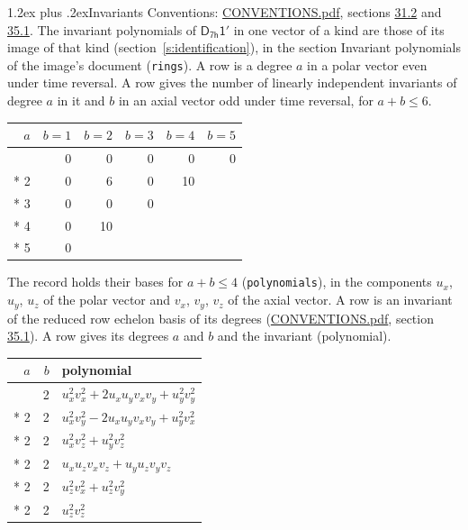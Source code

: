 \documentclass[10pt,a4paper]{article}
\makeatletter
\renewcommand\section{\@startsection{section}{1}{\z@}{-3ex plus -1ex minus -.2ex}%
  {1.2ex plus .2ex}{\normalfont\large\sffamily\bfseries\color{parttitle}}}
\numberwithin{equation}{section}
\newcommand{\grp}[1]{\mathsf{#1}}
\makeatother
\begin{document}
\section{Invariants}\label{s:invariants}
Conventions: \href{../../CONVENTIONS.pdf}{CONVENTIONS.pdf}, sections \href{../../CONVENTIONS.pdf\#conv.31.2}{31.2} and \href{../../CONVENTIONS.pdf\#conv.35.1}{35.1}.
The invariant polynomials of $\grp{D_{7h}1'}$ in one vector of a kind are those of its image of that kind (section~\ref{s:identification}), in the section Invariant polynomials of the image's document (\texttt{rings}).
\leavevmode\label{n:index.degree.polar}\label{n:index.degree.axial}A row is a degree $a$ in a polar vector even under time reversal. A row gives the number of linearly independent invariants of degree $a$ in it and $b$ in an axial vector odd under time reversal, for $a + b \le 6$.
{\small\begin{longtable}{@{}rrrrrr@{}}\toprule
$a$ & $b = 1$ & $b = 2$ & $b = 3$ & $b = 4$ & $b = 5$\\\midrule\endhead
\bottomrule\endfoot\endlastfoot
1 & 0 & 0 & 0 & 0 & 0\\*
2 & 0 & 6 & 0 & 10 & \\*
3 & 0 & 0 & 0 &  & \\*
4 & 0 & 10 &  &  & \\*
5 & 0 &  &  &  & \\
\bottomrule\end{longtable}}
\leavevmode\label{n:local.component.polar}\label{n:local.component.axial}The record holds their bases for $a + b \le 4$ (\texttt{polynomials}), in the components $u_{x}$, $u_{y}$, $u_{z}$ of the polar vector and $v_{x}$, $v_{y}$, $v_{z}$ of the axial vector. \label{n:head.polynomial}A row is an invariant of the reduced row echelon basis of its degrees (\href{../../CONVENTIONS.pdf}{CONVENTIONS.pdf}, section \href{../../CONVENTIONS.pdf\#conv.35.1}{35.1}). A row gives its degrees $a$ and $b$ and the invariant (polynomial).
{\small\renewcommand{\arraystretch}{1.2}\begin{longtable}{@{}rrl@{}}\toprule
$a$ & $b$ & polynomial\\\midrule\endhead
\bottomrule\endfoot\endlastfoot
2 & 2 & $u_{x}^{2}v_{x}^{2} + 2u_{x}u_{y}v_{x}v_{y} + u_{y}^{2}v_{y}^{2}$\\*
2 & 2 & $u_{x}^{2}v_{y}^{2} - 2u_{x}u_{y}v_{x}v_{y} + u_{y}^{2}v_{x}^{2}$\\*
2 & 2 & $u_{x}^{2}v_{z}^{2} + u_{y}^{2}v_{z}^{2}$\\*
2 & 2 & $u_{x}u_{z}v_{x}v_{z} + u_{y}u_{z}v_{y}v_{z}$\\*
2 & 2 & $u_{z}^{2}v_{x}^{2} + u_{z}^{2}v_{y}^{2}$\\*
2 & 2 & $u_{z}^{2}v_{z}^{2}$\\
\bottomrule\end{longtable}}
\end{document}

